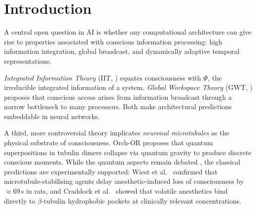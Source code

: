 \documentclass[11pt]{article}
\theoremstyle{definition}
\begin{document}
\begin{abstract}
\medskip
\noindent\textbf{Keywords:} liquid neural networks, microtubules, Global Workspace Theory, Integrated Information Theory, consciousness, anesthesia validation.
\end{abstract}

\section{Introduction}
\label{sec:intro}

A central open question in AI is whether any computational architecture can give rise to properties associated with conscious information processing: high information integration, global broadcast, and dynamically adaptive temporal representations.

\emph{Integrated Information Theory} (IIT, \citealt{tononi2004information}) equates consciousness with $\Phi$, the irreducible integrated information of a system. \emph{Global Workspace Theory} (GWT, \citealt{baars1988cognitive,dehaene2011experimental}) proposes that conscious access arises from information broadcast through a narrow bottleneck to many processors. Both make architectural predictions embeddable in neural networks.

A third, more controversial theory implicates \emph{neuronal microtubules} as the physical substrate of consciousness. Orch-OR \citep{penrose1994shadows,hameroff2014consciousness} proposes that quantum superpositions in tubulin dimers collapse via quantum gravity to produce discrete conscious moments. While the quantum aspects remain debated \citep{tegmark2000importance}, the classical predictions are experimentally supported: Wiest et al.\ \citep{wiest2025quantum} confirmed that microtubule-stabilising agents delay anesthetic-induced loss of consciousness by $\approx$69\,s in rats, and Craddock et al.\ \citep{craddock2017anesthetic} showed that volatile anesthetics bind directly to $\beta$-tubulin hydrophobic pockets at clinically relevant concentrations.
\end{document}
